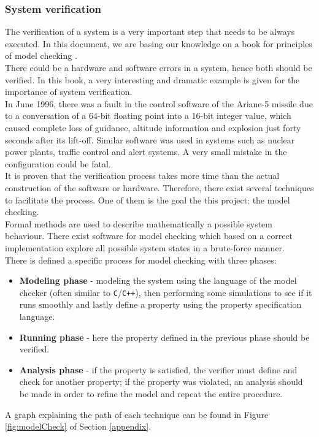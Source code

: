 \documentclass[a4paper, twocolumn]{article}
\begin{document}
\subsubsection{System verification} \label{sysVerif}
The verification of a system is a very important step that needs to be always executed. In this document, we are basing our knowledge on a book for principles of model checking \cite{book}.\\
There could be a hardware and software errors in a system, hence both should be verified. In this book, a very interesting and dramatic example is given for the importance of system verification.\\
In June 1996, there was a fault in the control software of the Ariane-5 missile due to a conversation of a 64-bit floating point into a 16-bit integer value, which caused complete loss of guidance, altitude information and explosion just forty seconds after its lift-off. Similar software was used in systems such as nuclear power plants, traffic control and alert systems. A very small mistake in the configuration could be fatal.\\
It is proven that the verification process takes more time than the actual construction of the software or hardware. Therefore, there exist several techniques to facilitate the process. One of them is the goal the this project: the model checking.\\
Formal methods are used to describe mathematically a possible system behaviour. There exist software for model checking which based on a correct implementation explore all possible system states in a brute-force manner.\\
There is defined a specific process for model checking with three phases:
\begin{itemize}
    \item \textbf{Modeling phase} - modeling the system using the language of the model checker (often similar to \texttt{C}/\texttt{C++}), then performing some simulations to see if it runs smoothly and lastly define a property using the property specification language.
    \item \textbf{Running phase} - here the property defined in the previous phase should be verified.
    \item \textbf{Analysis phase} - if the property is satisfied, the verifier must define and check for another property; if the property was violated, an analysis should be made in order to refine the model and repeat the entire procedure.
\end{itemize}
A graph explaining the path of each technique can be found in Figure \ref{fig:modelCheck} of Section \ref{appendix}.
\end{document}
